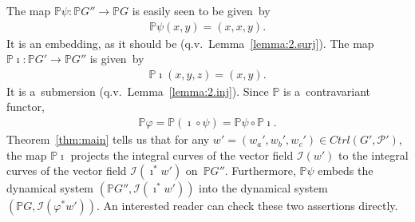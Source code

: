 \documentclass[10pt,a4paper]{amsart}
\numberwithin{equation}{section}
\renewcommand{\mathpzc}[1]{\mathit{#1}}
\begin{document}
\begin{Example}
The map $\mathbb{P} \psi\colon \mathbb{P} G'' \to \mathbb{P} G$ is easily seen to be given~by
\begin{gather*}
\mathbb{P}\psi (x,y) = (x,x,y).
\end{gather*}
It is an embedding, as it should be (q.v.\ Lemma~\ref{lemma:2.surj}).
The map $\mathbb{P} \imath\colon \mathbb{P} G'\to \mathbb{P} G''$ is given~by
\begin{gather*}
\mathbb{P} \imath (x,y,z) = (x,y).
\end{gather*}
It is a~submersion (q.v.\ Lemma~\ref{lemma:2.inj}).
Since $\mathbb{P}$ is a~contravariant functor,
\begin{gather*}
\mathbb{P} \varphi = \mathbb{P} (\imath \circ \psi) = \mathbb{P}\psi \circ \mathbb{P} \imath.
\end{gather*}
Theorem~\ref{thm:main} tells us that for any $w' = (w_a', w_b', w_c') \in \mathpzc{Ctrl} (G', {\mathcal P}')$, the map
$\mathbb{P} \imath$ projects the integral curves of the vector f\/ield $\mathscr{I} (w')$ to the integral curves of the
vector f\/ield $\mathscr{I} (\imath^* w')$ on~$\mathbb{P} G''$.
Furthermore, $\mathbb{P} \psi$ embeds the dynamical system $(\mathbb{P} G'', \mathscr{I} (\imath^* w'))$ into the
dynamical system $(\mathbb{P} G, \mathscr{I} (\varphi^* w'))$.
An interested reader can check these two assertions directly.
\end{Example}
\end{document}
